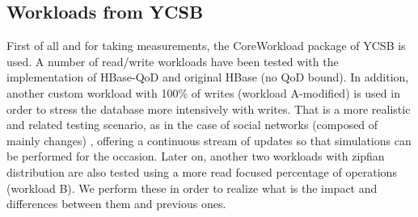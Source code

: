 \subsection{Workloads from YCSB}
First of all and for taking measurements, the CoreWorkload package of YCSB is used. A number of read/write workloads have been tested with the implementation of HBase-QoD and original HBase (no QoD bound). In addition, another custom workload with 100\% of writes (workload A-modified) is used in order to stress the database more intensively with writes. That is a more realistic and related testing scenario, as in the case of social networks (composed of mainly changes) , offering a continuous stream of updates so that simulations can be performed for the occasion. Later on, another two workloads with zipfian distribution are also tested using a more read focused percentage of operations (workload B). We perform these in order to realize what is the impact and differences between them and previous ones.

